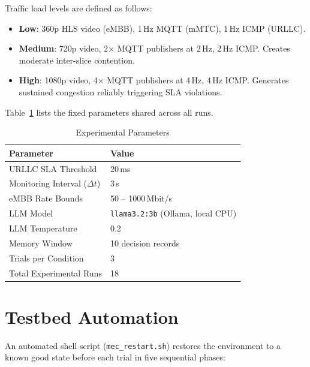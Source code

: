 \noindent
Traffic load levels are defined as follows:

\begin{itemize}[noitemsep, topsep=4pt]
  \item \textbf{Low}: 360p HLS video (eMBB), 1\,Hz MQTT (mMTC), 1\,Hz ICMP (URLLC).
  \item \textbf{Medium}: 720p video, 2× MQTT publishers at 2\,Hz, 2\,Hz ICMP.
        Creates moderate inter-slice contention.
  \item \textbf{High}: 1080p video, 4× MQTT publishers at 4\,Hz, 4\,Hz ICMP.
        Generates sustained congestion reliably triggering SLA violations.
\end{itemize}

Table~\ref{tab:exp_params} lists the fixed parameters shared across all runs.

\begin{table}[H]
\centering
\caption{Experimental Parameters}
\label{tab:exp_params}
\begin{tabular}{ll}
\toprule
\textbf{Parameter} & \textbf{Value} \\
\midrule
URLLC SLA Threshold              & 20\,ms \\
Monitoring Interval ($\Delta t$) & 3\,s \\
eMBB Rate Bounds                 & 50 -- 1000\,Mbit/s \\
LLM Model                        & \texttt{llama3.2:3b} (Ollama, local CPU) \\
LLM Temperature                  & 0.2 \\
Memory Window                    & 10 decision records \\
Trials per Condition             & 3 \\
Total Experimental Runs          & 18 \\
\bottomrule
\end{tabular}
\end{table}

\section{Testbed Automation}

An automated shell script (\texttt{mec\_restart.sh}) restores the environment
to a known good state before each trial in five sequential phases:

